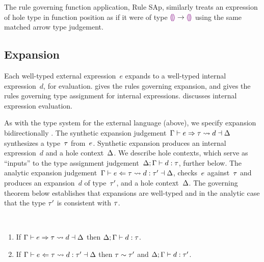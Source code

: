The rule governing function application, Rule {SAp}, similarly treats an expression of hole type in function position as if it were of type $\textcolor{violet}{\llparenthesis}\textcolor{violet}{\rrparenthesis} \rightarrow \textcolor{violet}{\llparenthesis}\textcolor{violet}{\rrparenthesis}$ using the same matched arrow type judgement.

\vspace{-4px}
\subsection{Expansion}
\label{sec:expansion}
\vspace{-1px}




Each well-typed external expression~$e$ expands to a well-typed internal expression~$d$, for evaluation.
%
 gives the rules governing expansion, and  gives the rules governing type assignment for internal expressions.
%
 discusses internal expression evaluation.

As with the type system for the external language (above), 
we specify expansion bidirectionally \cite{DBLP:conf/ppdp/FerreiraP14}.
%
The synthetic expansion judgement~$\Gamma \vdash e \Rightarrow \tau \leadsto d \dashv \Delta$ synthesizes a type~$\tau$ from~$e$.
%
Synthetic expansion produces an internal expression~$d$ and a hole context~$\Delta$.
%
We describe hole contexts, which serve as ``inputs'' to the type assignment judgement~$\Delta; \Gamma \vdash d : \tau$, further below. 
%
The analytic expansion judgement~$\Gamma \vdash e \Leftarrow \tau \leadsto d : \tau' \dashv \Delta$, checks~$e$ against~$\tau$ and produces an expansion~$d$ of type~$\tau'$, and a hole context~$\Delta$.
%
The governing theorem below establishes that expansions are well-typed and in the analytic case that the type $\tau'$ is consistent with $\tau$.
%
\begin{thm}\label{thm:typed-expansion} ~
  \begin{enumerate}[nolistsep]
    \item
      If $\Gamma \vdash e \Rightarrow \tau \leadsto d \dashv \Delta$
      then $\Delta; \Gamma \vdash d : \tau$.
    \item
      If $\Gamma \vdash e \Leftarrow \tau \leadsto d : \tau' \dashv \Delta$
      then $\tau \sim \tau'$ and $\Delta; \Gamma \vdash d : \tau'$.
  \end{enumerate}
\end{thm}
\noindent


